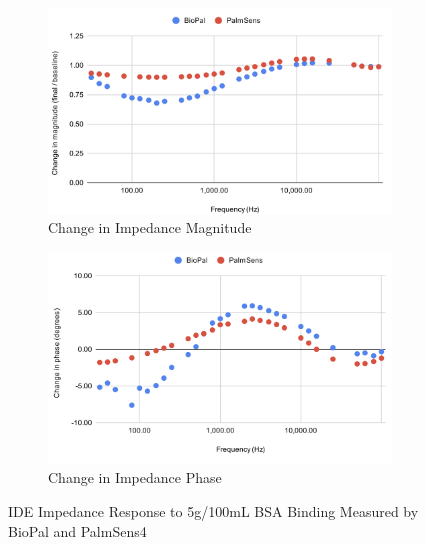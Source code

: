 \begin{figure}[H]
    \centering
    \begin{subfigure}{0.48\textwidth}   
        \includegraphics[width=\textwidth]{5g:100mL mag.png}
        \caption{Change in Impedance Magnitude}
        \label{fig:5g_mag}
    \end{subfigure}
    \hfill
    \begin{subfigure}{0.48\textwidth}
        \includegraphics[width=\textwidth]{5g:100mL phase.png}
        \caption{Change in Impedance Phase}
        \label{fig:5g_phase}
    \end{subfigure}
    \caption{IDE Impedance Response to 5g/100mL BSA Binding Measured by BioPal and PalmSens4}
    \label{fig:5g_bsa_comparison}
\end{figure}

